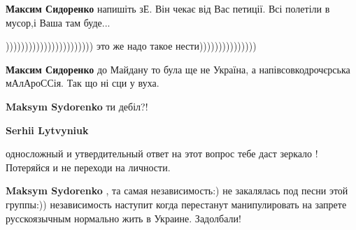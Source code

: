 \begin{itemize}
\begin{itemize}
\textbf{Максим Сидоренко} напишіть зЕ. Він чекає від Вас петиції. Всі полетіли в мусор,і Ваша там буде...

 
))))))))))))))))))))))) это же надо такое нести)))))))))))))))

 
\textbf{Максим Сидоренко} до Майдану то була ще не Україна, а напівсовкодрочєрська мАлАроССія. Так що ні сци у вуха.

 
\textbf{Maksym Sydorenko} ти дебіл?!

 
\textbf{Serhii Lytvyniuk} 

односложный и утвердительный ответ на этот вопрос тебе даст зеркало ! Потеряйся
и не переходи на личности.

 
\textbf{Maksym Sydorenko} , та самая независимость:) не закалялась под песни этой группы:)) независимость наступит когда перестанут манипулировать на запрете русскоязычным нормально жить в Украине. Задолбали!

 

\end{itemize}
\end{itemize}
